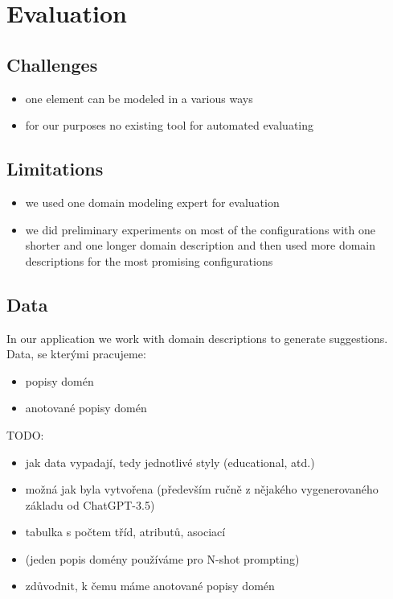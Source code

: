 \chapter{Evaluation}

\section{Challenges}
\begin{itemize}
\item one element can be modeled in a various ways
\item for our purposes no existing tool for automated evaluating
\end{itemize}


\section{Limitations}
\begin{itemize}
\item we used one domain modeling expert for evaluation
\item we did preliminary experiments on most of the configurations with one shorter and one longer domain description and then used more domain descriptions for the most promising configurations
\end{itemize}


\section{Data}

In our application we work with domain descriptions to generate suggestions. \\

Data, se kterými pracujeme:
\begin{itemize}
\item popisy domén
\item anotované popisy domén \\
\end{itemize}

TODO:
\begin{itemize}
\item jak data vypadají, tedy jednotlivé styly (educational, atd.)
\item možná jak byla vytvořena (především ručně z nějakého vygenerovaného základu od ChatGPT-3.5)
\item tabulka s počtem tříd, atributů, asociací
\item (jeden popis domény používáme pro N-shot prompting)
\item zdůvodnit, k čemu máme anotované popisy domén
\end{itemize}


